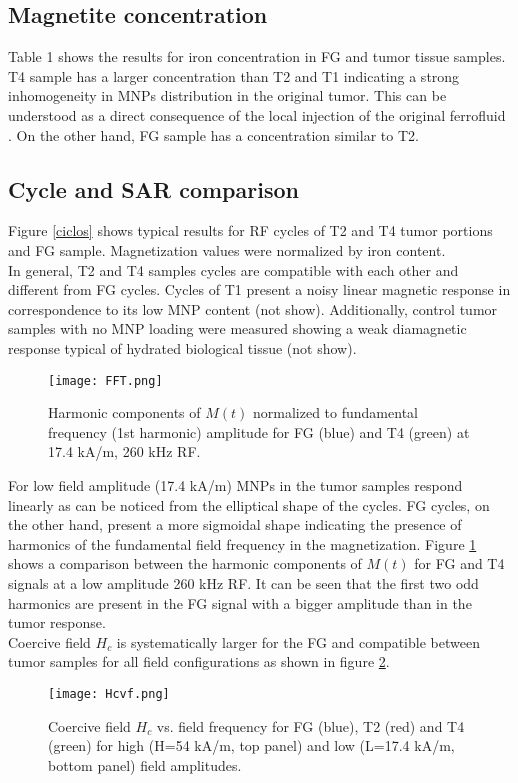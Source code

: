 \documentclass[preprint,12pt]{elsarticle}
\begin{document}
\subsection{Magnetite concentration}
Table 1 shows the results for iron concentration in FG and tumor   tissue samples. T4 sample has a larger concentration than T2 and T1 indicating a strong inhomogeneity in MNPs distribution in the original tumor. This can be understood as a direct consequence of the local injection of the original ferrofluid . On the other hand, FG sample has a concentration similar to T2.


\subsection{Cycle and SAR comparison}
Figure \ref{ciclos} shows typical results for RF cycles of T2 and T4 tumor portions and FG sample. Magnetization values were normalized by iron content.\\
In general, T2 and T4 samples cycles are compatible with each other and different from FG cycles. Cycles of T1 present a noisy linear magnetic response in correspondence to its low MNP content (not show). Additionally, control tumor samples with no MNP loading were measured showing a weak diamagnetic response typical of hydrated biological tissue (not show). \\ 
\begin{figure}
    \centering
    \texttt{[image: FFT.png]}
    \caption{Harmonic components of $M(t)$ normalized to fundamental frequency (1st harmonic) amplitude for FG (blue) and T4 (green) at 17.4 kA/m, 260 kHz RF.}
    \label{FFT}
\end{figure}
For low field amplitude (17.4 kA/m) MNPs in the tumor samples respond linearly as can be noticed from the elliptical shape of the cycles. FG cycles, on the other hand, present a more sigmoidal shape indicating the presence of harmonics of the fundamental field frequency in the magnetization. Figure \ref{FFT} shows a comparison between the harmonic components of $M(t)$ for FG and T4  signals at a low amplitude 260 kHz RF. It can be seen that the first two odd harmonics are present in the FG signal with a bigger amplitude than in the tumor response.\\

Coercive field $H_c$ is systematically larger for the FG and compatible between tumor samples for all field configurations as shown in figure \ref{Hc}.

\begin{figure}
    \centering
    \texttt{[image: Hcvf.png]}
    \caption{Coercive field $H_c$ vs. field frequency for FG (blue), T2 (red) and T4 (green) for high (H=54 kA/m, top panel) and low (L=17.4 kA/m, bottom panel) field amplitudes.}
    \label{Hc}
\end{figure}
\end{document}

